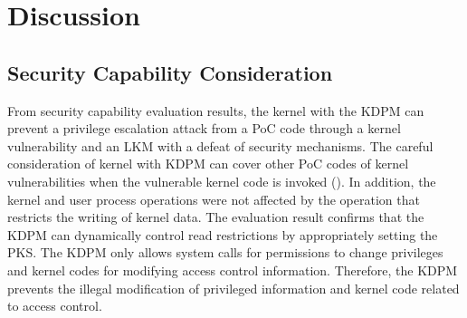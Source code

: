 \section{Discussion}  \label{section:discussion}
\subsection{Security Capability Consideration}
From security capability evaluation results, the kernel with the KDPM
can prevent a privilege escalation attack from a PoC code through 
a kernel vulnerability and an LKM with a defeat of security mechanisms.
%
The careful consideration of kernel with KDPM can cover other PoC codes of
kernel vulnerabilities when the vulnerable kernel code is invoked
().
%
%
%
%
In addition, the kernel and user process operations were not affected by the
operation that restricts the writing of kernel data.
%
The evaluation result confirms that the KDPM can
dynamically control read restrictions by appropriately setting the PKS.
%
The KDPM only allows system calls for permissions to change privileges
and kernel codes for modifying access control information.
%
Therefore, the KDPM prevents the illegal modification of privileged information
and kernel code related to access control.

